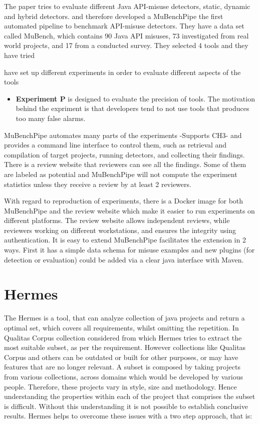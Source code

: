\documentclass[authoryear,preprint]{sigplanconf}
\begin{document}
The paper tries to evaluate different Java API-misuse detectors, static, dynamic and hybrid detectors. and therefore developed a MuBenchPipe \cite{8338426} the first automated pipeline to benchmark API-misuse detectors. They have a data set called MuBench, which contains 90 Java API misuses, 73 investigated from real world projects, and 17 from a conducted survey. They
selected 4 tools and they have tried

 have set up different experiments in order to evaluate different aspects of the tools

\begin{itemize}
	\item \textbf{Experiment P} is designed to evaluate the precision of tools. The motivation behind the expriment is that developers tend to not use tools that produces too many false alarms. 
\end{itemize}

MuBenchPipe automates many parts of the experiments -Supports CH3- and provides a command line interface to control them, such as retrieval and compilation of target projects, running detectors, and collecting their findings. There is a review website that reviewers can see all the findings. Some of them are labeled as potential and MuBenchPipe will not compute the experiment statistics unless they receive a review by at least 2 reviewers. 

With regard to reproduction of experiments, there is a Docker image for both MuBenchPipe and the review website which make it easier to run experiments on different platforms. The review website allows independent reviews, while reviewers working on different workstations, and ensures the integrity using authentication. It is easy to extend MuBenchPipe facilitates the extension in 2 ways. First it has a simple data schema for misuse examples and new plugins (for detection or evaluation) could be added via a clear java interface with Maven. 

\section{Hermes}
\label{sec:sec_hermes}
The Hermes\cite{Reif:2017:HAC:3088515.3088523} is a tool, that can analyze collection of java projects and return a optimal set, which covers all requirements, whilst omitting the repetition. In Qualitas Corpus\cite{5693210} \cite{Dingsoyr:2013:RCL:2507288.2507322} collection considered from which Hermes tries to extract the most suitable subset, as per the requirement. However collections like Qualitas Corpus and others can be outdated or built for other purposes, or may have features that are no longer relevant. A subset is composed by taking projects from various collections, across domains which would be developed by various people. Therefore, these projects vary in style, size and methodology. Hence understanding the properties within each of the project that comprises the subset is difficult. Without this understanding it is not possible to establish conclusive results. Hermes helps to overcome these issues with a two step approach, that is:
\end{document}
